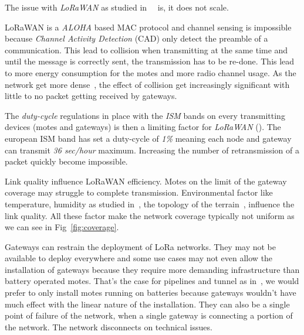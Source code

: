 

The issue with \emph{LoRaWAN} as studied 
in~\cite{8030482}~\cite{10.1145/2988287.2989163} is, it does not scale. 

LoRaWAN is a \emph{ALOHA} based MAC protocol and channel sensing is impossible 
because \emph{Channel Activity Detection} (CAD) only detect the preamble of a 
communication. %
This lead to collision when transmitting at the same time and until the message 
is correctly sent, the transmission has to be re-done.
This lead to more energy consumption for the motes and more radio 
channel usage.
As the network get more dense~\cite{8030482}, the effect of collision get 
increasingly significant with little to no packet getting received by gateways.

The \emph{duty-cycle} regulations in place with the \emph{ISM} bands on every
transmitting devices (motes and gateways) is then a limiting factor 
for \emph{LoRaWAN} (\cite{8030482}).
The european ISM band has set a duty-cycle of \emph{1\%} meaning each node 
and gateway can transmit \emph{36 sec/hour} maximum. 
Increasing the number of retransmission of a packet quickly become impossible.

Link quality influence LoRaWAN efficiency. 
Motes on the limit of the gateway coverage may struggle to
complete transmission. 
Environmental factor like temperature, humidity as studied 
in~\cite{evaluation_of_the_reliability_of_lora}, the topology of the 
terrain~\cite{lorajambalaya}, influence the link quality.
All these factor make the network coverage typically not uniform 
as we can see in Fig~\ref{fig:coverage}.

Gateways can restrain the deployment of LoRa networks.
They may not be available to deploy everywhere and some use cases may not even allow
the installation of gateways because they require more demanding infrastructure 
than battery operated motes.
That's the case for pipelines and tunnel as in~\cite{Abrardo_2019},
we would prefer to only install motes running on batteries because
gateways wouldn't have much effect with the linear nature of the installation.
They can also be a single point of failure of the network, when a single
gateway is connecting a portion of the network. 
The network disconnects on technical issues.

